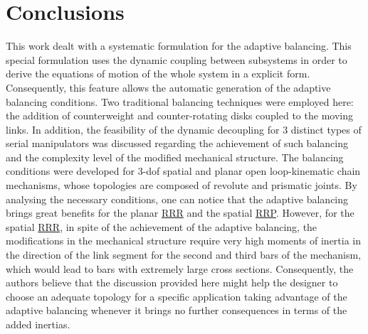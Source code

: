 \documentclass[a4paper,11pt,brazil,fleqn]{article}
\begin{document}


\section{Conclusions}\label{S04}

This work dealt with a systematic formulation for the adaptive balancing. This special formulation uses the dynamic coupling between subsystems in order to derive the equations of motion of the whole system in a explicit form. Consequently, this feature allows the automatic generation of the adaptive balancing conditions. Two traditional balancing techniques were employed here: the addition of counterweight and counter-rotating disks coupled to the moving links. In addition, the feasibility of the dynamic decoupling for 3 distinct types of serial manipulators was discussed regarding the achievement of such balancing and the complexity level of the modified mechanical structure. The balancing conditions were developed for 3-dof spatial and planar open loop-kinematic chain mechanisms, whose topologies are composed of revolute and prismatic joints. By analysing the necessary conditions, one can notice that the adaptive balancing  brings great benefits for the planar \underline{RRR} and the spatial \underline{RRP}. However, for the spatial \underline{RRR}, in spite of the achievement of the adaptive balancing, the modifications in the mechanical structure require very high moments of inertia in the direction of the link segment for the second and third bars of the mechanism, which would lead to bars with extremely large cross sections. Consequently, the authors believe that the discussion provided here might help the designer to choose an adequate topology for a specific application taking advantage of the adaptive balancing whenever it brings no further consequences in terms of the added inertias.





{} 



\end{document}
